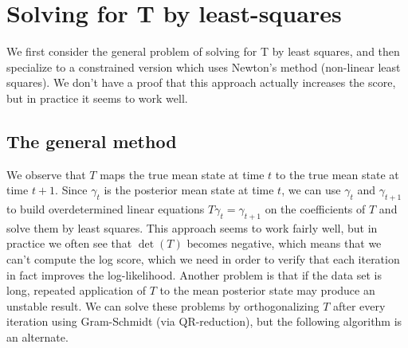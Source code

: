 \documentclass[12pt,leqno]{article}
\begin{document}
\section{Solving for T by least-squares}\label{least_squares}
We first consider the general problem of solving for T by least squares, and then specialize to a constrained
version which uses Newton's method (non-linear least squares).  We don't have a proof that this approach actually
increases the score, but in practice it seems to work well.

\subsection{The general method} We observe that $T$ maps the true mean state at time $t$ to the true mean state at
time $t+1$.  Since $\gamma_t$ is the posterior mean state at time $t$, we can use $\gamma_t$ and
$\gamma_{t+1}$ to build overdetermined linear equations $T\gamma_t = \gamma_{t+1}$ on the coefficients of $T$
and solve them by least squares.
This approach seems to work fairly well, but in practice we often see that $\det(T)$ becomes negative,
which means that we can't compute the log score, which we need in order to verify that each iteration in fact
improves the log-likelihood.  Another problem is that if the data set is long, repeated application of $T$ to the
mean posterior state may produce an unstable result.  We can solve these problems by orthogonalizing $T$
after every iteration using Gram-Schmidt (via QR-reduction), but the following algorithm is an alternate.
\end{document}
